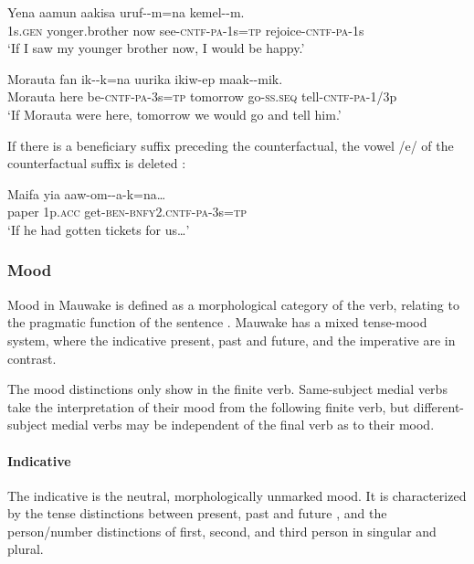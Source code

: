 \ea%
\label{ex:3:x433}
\gll Yena aamun aakisa uruf--m=na kemel--m. \\
1s.\textsc{gen} yonger.brother now see-\textsc{cntf}-\textsc{pa}-1s=\textsc{tp} rejoice-\textsc{cntf}-\textsc{pa}-1s\\
\glt`If I saw my younger brother now, I would be happy.'
\z

\ea%
\label{ex:3:x434}
\gll Morauta fan ik--k=na uurika ikiw-ep maak--mik.\\
Morauta here be-\textsc{cntf}-\textsc{pa}-3s=\textsc{tp} tomorrow go-\textsc{ss}.\textsc{seq} tell-\textsc{cntf}-\textsc{pa}-1/3p\\
\glt`If Morauta were here, tomorrow we would go and tell him.'
\z

If there is a beneficiary suffix  preceding the counterfactual, the vowel /e/ of the counterfactual suffix is deleted :

\ea%
\label{ex:3:x235}
\gll Maifa yia aaw-om--a-k=na{\dots} \\
paper 1p.\textsc{acc} get-\textsc{ben}-\textsc{bnfy}2.\textsc{cntf}-\textsc{pa}-3s=\textsc{tp} \\
\glt`If he had gotten tickets for us{\dots}'
\z

\subsubsection{Mood}\label{sec:3.8.3.3}
{}
Mood in Mauwake is defined as a morphological category of the verb, relating to the pragmatic function of the sentence \citep[cf.][21]{Palmer1986}. Mauwake has a mixed tense-mood system, where the indicative present, past and future, and the imperative are in contrast. 

The mood distinctions only show in the finite verb. Same-subject medial verbs take the interpretation of their mood from the following finite verb, but different-subject medial verbs may be independent of the final verb as to their mood.

\paragraph{Indicative}
{}
The indicative is the neutral, morphologically unmarked mood. It is characterized by the tense distinctions between present, past  and future , and the person/number distinctions of first, second, and third person in singular and plural. 

